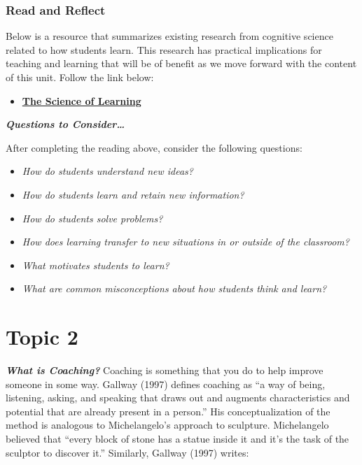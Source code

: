 \documentclass[
]{book}
\providecommand{\tightlist}{%
  \setlength{\itemsep}{0pt}\setlength{\parskip}{0pt}}
\begin{document}
\begin{reflect}
\hypertarget{read-and-reflect-1}{%
\subsubsection*{Read and Reflect}\label{read-and-reflect-1}}

Below is a resource that summarizes existing research from cognitive science related to how students learn. This research has practical implications for teaching and learning that will be of benefit as we move forward with the content of this unit. Follow the link below:

\begin{itemize}
\tightlist
\item
  \href{https://deansforimpact.org/wp-content/uploads/2016/12/The_Science_of_Learning.pdf}{\textbf{The Science of Learning}}
\end{itemize}

\textbf{\emph{Questions to Consider\ldots{}}}

After completing the reading above, consider the following questions:

\begin{itemize}
\tightlist
\item
  \emph{How do students understand new ideas?}
\item
  \emph{How do students learn and retain new information?}
\item
  \emph{How do students solve problems?}
\item
  \emph{How does learning transfer to new situations in or outside of the classroom?}
\item
  \emph{What motivates students to learn?}
\item
  \emph{What are common misconceptions about how students think and learn?}
\end{itemize}
\end{reflect}

\hypertarget{topic-2-1}{%
\section*{Topic 2}\label{topic-2-1}}

\textbf{\emph{What is Coaching?}} Coaching is something that you do to help improve someone in some way. Gallway (1997) defines coaching as ``a way of being, listening, asking, and speaking that draws out and augments characteristics and potential that are already present in a person.'' His conceptualization of the method is analogous to Michelangelo's approach to sculpture. Michelangelo believed that ``every block of stone has a statue inside it and it's the task of the sculptor to discover it.'' Similarly, Gallway (1997) writes:
\end{document}
